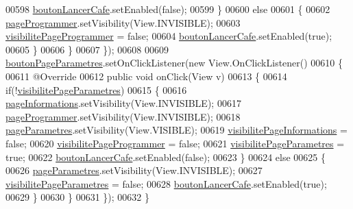 \begin{DoxyCode}
00598                     \hyperlink{classcom_1_1example_1_1ekawa_1_1_ihm_af64465b03533ddddfaac1a55b0f14012}{boutonLancerCafe}.setEnabled(\textcolor{keyword}{false});
00599                 \}
00600                 \textcolor{keywordflow}{else}
00601                 \{
00602                     \hyperlink{classcom_1_1example_1_1ekawa_1_1_ihm_a9a3747e82c5917a681a8d8a726cd5fa8}{pageProgrammer}.setVisibility(View.INVISIBLE);
00603                     \hyperlink{classcom_1_1example_1_1ekawa_1_1_ihm_a1db719bfa9b48f6c1f64259e37703963}{visibilitePageProgrammer} = \textcolor{keyword}{false};
00604                     \hyperlink{classcom_1_1example_1_1ekawa_1_1_ihm_af64465b03533ddddfaac1a55b0f14012}{boutonLancerCafe}.setEnabled(\textcolor{keyword}{true});
00605                 \}
00606             \}
00607         \});
00608 
00609         \hyperlink{classcom_1_1example_1_1ekawa_1_1_ihm_a11fe63d247e6b4966aac0086c06bd495}{boutonPageParametres}.setOnClickListener(\textcolor{keyword}{new} View.OnClickListener()
00610         \{
00611             @Override
00612             \textcolor{keyword}{public} \textcolor{keywordtype}{void} onClick(View v)
00613             \{
00614                 \textcolor{keywordflow}{if}(!\hyperlink{classcom_1_1example_1_1ekawa_1_1_ihm_abc6f7d562f994f120a9034a9e11b72d0}{visibilitePageParametres})
00615                 \{
00616                     \hyperlink{classcom_1_1example_1_1ekawa_1_1_ihm_a554ab8cbe600e837516ec78e62312fea}{pageInformations}.setVisibility(View.INVISIBLE);
00617                     \hyperlink{classcom_1_1example_1_1ekawa_1_1_ihm_a9a3747e82c5917a681a8d8a726cd5fa8}{pageProgrammer}.setVisibility(View.INVISIBLE);
00618                     \hyperlink{classcom_1_1example_1_1ekawa_1_1_ihm_a12537211f4d695c3dc62713da00ffa35}{pageParametres}.setVisibility(View.VISIBLE);
00619                     \hyperlink{classcom_1_1example_1_1ekawa_1_1_ihm_a3a1aee8b3e12447c5a73aa16de64b1f0}{visibilitePageInformations} = \textcolor{keyword}{false};
00620                     \hyperlink{classcom_1_1example_1_1ekawa_1_1_ihm_a1db719bfa9b48f6c1f64259e37703963}{visibilitePageProgrammer} = \textcolor{keyword}{false};
00621                     \hyperlink{classcom_1_1example_1_1ekawa_1_1_ihm_abc6f7d562f994f120a9034a9e11b72d0}{visibilitePageParametres} = \textcolor{keyword}{true};
00622                     \hyperlink{classcom_1_1example_1_1ekawa_1_1_ihm_af64465b03533ddddfaac1a55b0f14012}{boutonLancerCafe}.setEnabled(\textcolor{keyword}{false});
00623                 \}
00624                 \textcolor{keywordflow}{else}
00625                 \{
00626                     \hyperlink{classcom_1_1example_1_1ekawa_1_1_ihm_a12537211f4d695c3dc62713da00ffa35}{pageParametres}.setVisibility(View.INVISIBLE);
00627                     \hyperlink{classcom_1_1example_1_1ekawa_1_1_ihm_abc6f7d562f994f120a9034a9e11b72d0}{visibilitePageParametres} = \textcolor{keyword}{false};
00628                     \hyperlink{classcom_1_1example_1_1ekawa_1_1_ihm_af64465b03533ddddfaac1a55b0f14012}{boutonLancerCafe}.setEnabled(\textcolor{keyword}{true});
00629                 \}
00630             \}
00631         \});
00632     \}
\end{DoxyCode}
